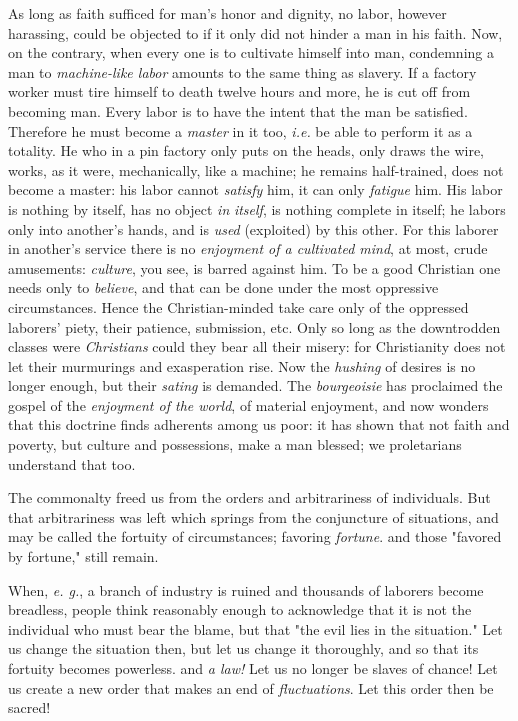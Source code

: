 As long as faith sufficed for man's honor and dignity, no labor, however 
harassing, could be objected to if it only did not hinder a man in his faith. 
Now, on the contrary, when every one is to cultivate himself into man, 
condemning a man to \textit{machine-like labor} amounts to the same thing as 
slavery. If a factory worker must tire himself to death twelve hours and more, 
he is cut off from becoming man. Every labor is to have the intent that the 
man be satisfied. Therefore he must become a \textit{master} in it too, 
\textit{i.e.} be able to perform it as a totality. He who in a pin factory 
only puts on the heads, only draws the wire, works, as it were, mechanically, 
like a machine; he remains half-trained, does not become a master: his labor 
cannot \textit{satisfy} him, it can only \textit{fatigue} him. His labor is 
nothing by itself, has no object \textit{in} \textit{itself}, is nothing 
complete in itself; he labors only into another's hands, and is \textit{used} 
(exploited) by this other. For this laborer in another's service there is no 
\textit{enjoyment of a cultivated mind}, at most, crude amusements: 
\textit{culture}, you see, is barred against him. To be a good Christian one 
needs only to \textit{believe}, and that can be done under the most oppressive 
circumstances. Hence the Christian-minded take care only of the oppressed 
laborers' piety, their patience, submission, etc. Only so long as the 
downtrodden classes were \textit{Christians} could they bear all their misery: 
for Christianity does not let their murmurings and exasperation rise. Now the 
\textit{hushing} of desires is no longer enough, but their \textit{sating} is 
demanded. The \textit{bourgeoisie} has proclaimed the gospel of the 
\textit{enjoyment of the world}, of material enjoyment, and now wonders that 
this doctrine finds adherents among us poor: it has shown that not faith and 
poverty, but culture and possessions, make a man blessed; we proletarians 
understand that too.

The commonalty freed us from the orders and arbitrariness of individuals. But 
that arbitrariness was left which springs from the conjuncture of situations, 
and may be called the fortuity of circumstances; favoring \textit{fortune}. 
and those "{}favored by fortune,"{} still remain.

When, \textit{e. g.}, a branch of industry is ruined and thousands of laborers 
become breadless, people think reasonably enough to acknowledge that it is not 
the individual who must bear the blame, but that "{}the evil lies in the 
situation."{} Let us change the situation then, but let us change it 
thoroughly, and so that its fortuity becomes powerless. and \textit{a law!} 
Let us no longer be slaves of chance! Let us create a new order that makes an 
end of \textit{fluctuations}. Let this order then be sacred!

